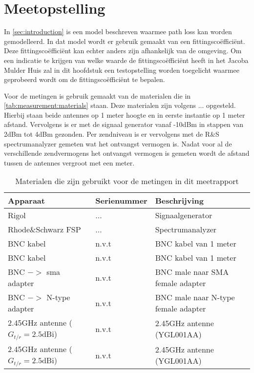 \section{Meetopstelling} \label{sec:methods}
In \autoref{sec:introduction} is een model beschreven waarmee path loss kan worden gemodelleerd. In dat model wordt er gebruik gemaakt van een fittingscoëfficiënt. Deze fittingscoëfficiënt kan echter anders zijn afhankelijk van de omgeving. Om een indicatie te krijgen van welke waarde de fittingscoëfficiënt heeft in het Jacoba Mulder Huis zal in dit hoofdstuk een testopstelling worden toegelicht waarmee geprobeerd wordt om de fittingscoëfficiënt te bepalen.

Voor de metingen is gebruik gemaakt van de materialen die in \autoref{tab:measurement:materials} staan. Deze materialen zijn volgens ... opgesteld. Hierbij staan beide antennes op 1 meter hoogte en in eerste instantie op 1 meter afstand. Vervolgens is er met de signaal generator vanaf -10dBm in stappen van 2dBm tot 4dBm gezonden. Per zendniveau is er vervolgens met de R\&S spectrumanalyzer gemeten wat het ontvangst vermogen is. Nadat voor al de verschillende zendvermogens het ontvangst vermogen is gemeten wordt de afstand tussen de antennes vergroot met een meter.
\begin{table}[ht]
    \centering
    \begin{tabular}{l|l|l}
        Apparaat                            & Serienummer   & Beschrijving \\\hline
        Rigol                               & ...           & Signaalgenerator \\
        Rhode\&Schwarz FSP                  & ...           & Spectrumanalyzer \\
        BNC kabel                           & n.v.t         & BNC kabel van 1 meter \\
        BNC kabel                           & n.v.t         & BNC kabel van 1 meter \\
        BNC $->$ sma adapter                & n.v.t         & BNC male naar SMA female adapter \\
        BNC $->$ N-type adapter             & n.v.t         & BNC male naar N-type female adapter \\
        2.45GHz antenne ($G_{t/r}=2.5$dBi)  & n.v.t         & 2.45GHz antenne (YGL001AA) \\
        2.45GHz antenne ($G_{t/r}=2.5$dBi)  & n.v.t         & 2.45GHz antenne (YGL001AA) \\\hline
    \end{tabular}
    \caption{Materialen die zijn gebruikt voor de metingen in dit meetrapport}
    \label{tab:measurement:materials}
\end{table}




